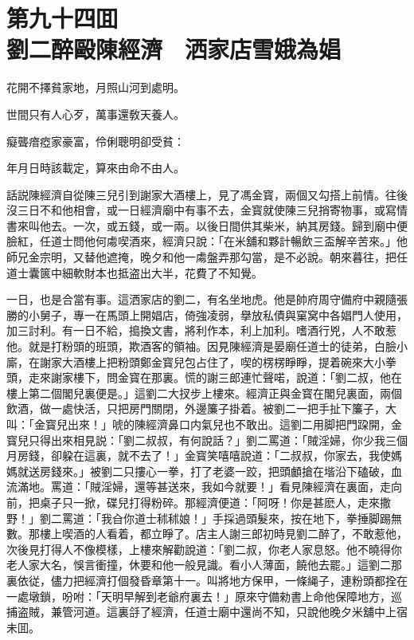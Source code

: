 
\chapter*{第九十四囬　\\劉二醉毆陳經濟　洒家店雪娥為娼}


\begin{myquote}
花開不擇貧家地，月照山河到處明。

世間只有人心歹，萬事還敎天養人。

癡聾瘖瘂家豪富，伶俐聰明卻受貧：

年月日時該載定，算來由命不由人。
\end{myquote}

話説陳經濟自從陳三兒引到謝家大酒樓上，見了馮金寳，兩個又勾搭上前情。往後沒三日不和他相會，或一日經濟廟中有事不去，金寳就使陳三兒捎寄物事，或寫情書來叫他去。一次，或五錢，或一兩。以後日間供其柴米，納其房錢。歸到廟中便臉紅，任道士問他何䖏喫酒來，經濟只說：「在米舖和夥計暢飲三盃解辛苦來。」他師兄金宗明，又替他遮掩，晚夕和他一䖏盤弄那勾當，是不必說。朝來暮往，把任道士囊篋中細軟財本也抵盗出大半，花費了不知覺。

一日，也是合當有事。這洒家店的劉二，有名坐地虎。他是帥府周守備府中親隨張勝的小舅子，專一在馬頭上開娼店，倚強凌弱，擧放私債與窠窝中各娼門人使用，加三討利。有一日不給，搗換文書，將利作本，利上加利。嗜酒行兇，人不敢惹他。就是打粉頭的班頭，欺酒客的領袖。因見陳經濟是晏廟任道士的徒弟，白臉小廝，在謝家大酒樓上把粉頭鄭金寳兒包占住了，喫的楞楞睜睜，提着碗來大小拳頭，走來謝家樓下，問金寳在那裏。慌的謝三郎連忙聲喏，說道：「劉二叔，他在樓上第二個閣兒裏便是。」這劉二大扠步上樓來。經濟正與金寳在閣兒裏面，兩個飲酒，做一處快活，只把房門關閉，外邊簾子掛着。被劉二一把手扯下簾子，大叫：「金寳兒出來！」唬的陳經濟鼻口内氣兒也不敢出。這劉二用脚把門跥開，金寳兒只得出來相見説：「劉二叔叔，有何說話？」劉二罵道：「賊淫婦，你少我三個月房錢，卻躱在這裏，就不去了！」金寳笑嘻嘻說道：「二叔叔，你家去，我使媽媽就送房錢來。」被劉二只摟心一拳，打了老婆一跤，把頭顱搶在堦沿下磕破，血流滿地。罵道：「賊淫婦，還等甚送來，我如今就要！」看見陳經濟在裏面，走向前，把桌子只一掀，碟兒打得粉碎。那經濟便道：「阿呀！你是甚麽人，走來撒野！」劉二罵道：「我㒲你道士秫秫娘！」手採過頭髮來，按在地下，拳捶脚踢無數。那樓上喫酒的人看着，都立睜了。店主人謝三郎初時見劉二醉了，不敢惹他，次後見打得人不像模樣，上樓來解勸說道：「劉二叔，你老人家息怒。他不曉得你老人家大名，悞言衝撞，休要和他一般見識。看小人薄面，饒他去罷。」這劉二那裏依従，儘力把經濟打個發昏章第十一。叫將地方保甲，一條䋲子，連粉頭都拴在一處墩鎖，吩咐：「天明早解到老爺府裏去！」原來守備勑書上命他保障地方，巡捕盗賊，兼管河道。這裏㧱了經濟，任道士廟中還尚不知，只說他晚夕米舖中上宿未囬。

